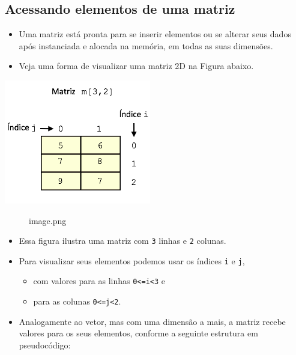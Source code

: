 \documentclass[12pt,a4paper]{article}
\providecommand{\tightlist}{%
      \setlength{\itemsep}{0pt}\setlength{\parskip}{0pt}}
\begin{document}
    \hypertarget{acessando-elementos-de-uma-matriz}{%
\subsection{Acessando elementos de uma
matriz}\label{acessando-elementos-de-uma-matriz}}

    \begin{itemize}
\tightlist
\item
  Uma matriz está pronta para se inserir elementos ou se alterar seus
  dados após instanciada e alocada na memória, em todas as suas
  dimensões.
\item
  Veja uma forma de visualizar uma matriz 2D na Figura abaixo.
\end{itemize}

\includegraphics{"figs/image40.png"}

    \begin{figure}
\centering
\caption{image.png}
\end{figure}

    \begin{itemize}
\tightlist
\item
  Essa figura ilustra uma matriz com \texttt{3} linhas e \texttt{2}
  colunas.
\item
  Para visualizar seus elementos podemos usar os índices \texttt{i} e
  \texttt{j},

  \begin{itemize}
  \tightlist
  \item
    com valores para as linhas \texttt{0\textless{}=i\textless{}3} e
  \item
    para as colunas \texttt{0\textless{}=j\textless{}2}.
  \end{itemize}
\item
  Analogamente ao vetor, mas com uma dimensão a mais, a matriz recebe
  valores para os seus elementos, conforme a seguinte estrutura em
  pseudocódigo:
\end{itemize}
\end{document}
